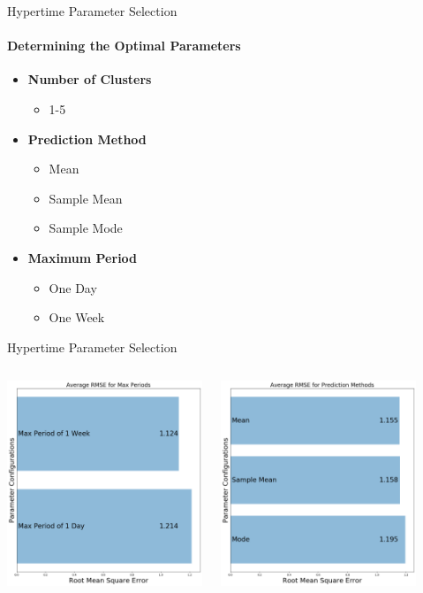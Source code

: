 \documentclass{beamer}
\begin{document}
\begin{frame}[t]{Hypertime Parameter Selection}
  \framesubtitle{Determining the Optimal Parameters}
  \begin{itemize}
    \setlength\itemsep{1em}

  \item \textbf{Number of Clusters}
    \begin{itemize}
      \item 1-5
    \end{itemize}
  \item \textbf{Prediction Method}
    \begin{itemize}
      \item Mean
      \item Sample Mean
      \item Sample Mode
    \end{itemize}
  \item \textbf{Maximum Period}
    \begin{itemize}
      \item One Day
      \item One Week
    \end{itemize}
  \end{itemize}
\end{frame}



\begin{frame}[t]{Hypertime Parameter Selection}

  \begin{columns}[t]
    {\includegraphics[width=2.3in]{images/Average_RMSE_for_Max_Periods.png}}

    {\includegraphics[width=2.3in]{images/Average_RMSE_for_Prediction_Methods.png}}
  \end{columns}

\end{frame}
\end{document}
